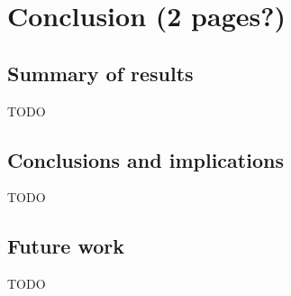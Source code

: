 \section{Conclusion (2 pages?)}

\subsection{Summary of results}

TODO

\subsection{Conclusions and implications}

TODO

\subsection{Future work}

TODO

